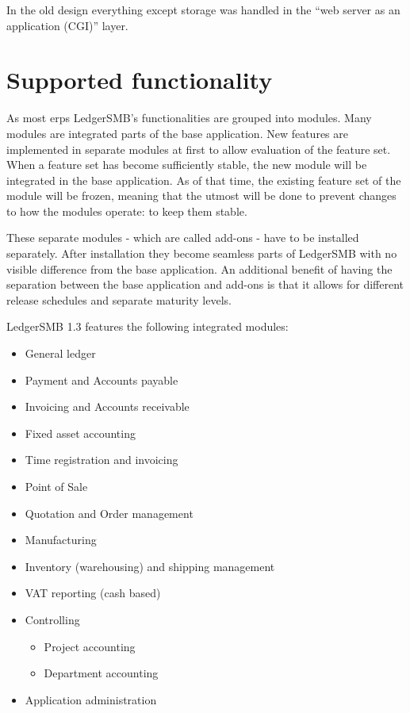 In the old design everything except storage was handled in the ``web server as an
application (CGI)'' layer.


\section{Supported functionality}
\label{sec-ledgersmb-modules}
As most \glspl{erp} LedgerSMB's functionalities are grouped into modules.
Many modules are integrated parts of the base application.  New features
are implemented in separate modules at first to allow evaluation of the
feature set. When a feature set has become sufficiently stable, the new
module will be integrated in the base application. As of that time, the
existing feature set of the module will be frozen, meaning that the utmost
will be done to prevent changes to how the modules operate: to keep them
stable.

These separate modules - which are called \glspl{add-on} - have to be
installed separately. After installation they become seamless parts of
LedgerSMB with no visible difference from the base application. An
additional benefit of having the separation between the base application
and \glspl{add-on} is that it allows for different release schedules
and separate maturity levels.


LedgerSMB 1.3 features the following integrated modules:

\begin{itemize}
\item General ledger
\item Payment and Accounts payable
\item Invoicing and Accounts receivable
\item Fixed asset accounting
\item Time registration and invoicing
\item Point of Sale
\item Quotation and Order management
\item Manufacturing
\item Inventory (warehousing) and shipping management
\item VAT reporting (cash based)
\item Controlling
\begin{itemize}
\item Project accounting
\item Department accounting
\end{itemize}
\item Application administration
\end{itemize}

